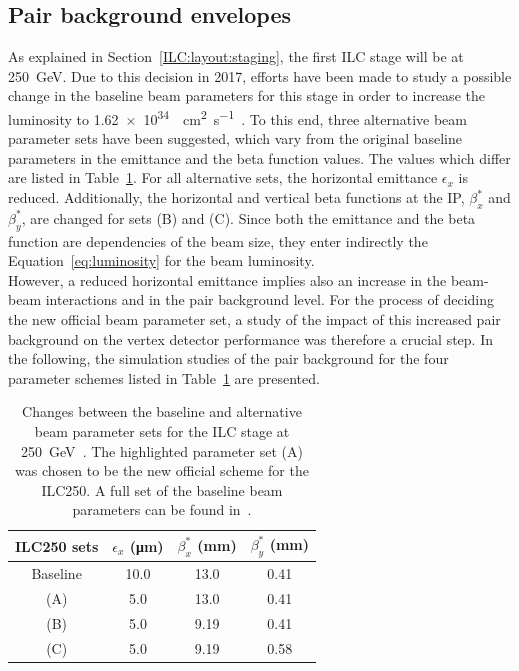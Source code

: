 \subsection{Pair background envelopes}
\label{PairBkg:envelopes}
As explained in Section~\ref{ILC:layout:staging}, the first ILC stage will be at \SI{250}{\GeV}.
Due to this decision in 2017, efforts have been made to study a possible change in the baseline beam parameters for this stage in order to increase the luminosity to \SI{1.62e34}{\per\centi\meter\squared\per\second}~\cite{LCWS17_paper}.
To this end, three alternative beam parameter sets have been suggested, which vary from the original baseline parameters in the emittance and the beta function values.
The values which differ are listed in Table~\ref{tab:ILC250_sets}.
For all alternative sets, the horizontal emittance $\epsilon_x$ is reduced. 
Additionally, the horizontal and vertical beta functions at the IP, $\beta^*_x$ and $\beta^*_y$, are changed for sets (B) and (C).
Since both the emittance and the beta function are dependencies of the beam size, they enter indirectly the Equation~\ref{eq:luminosity} for the beam luminosity.
\\However, a reduced horizontal emittance implies also an increase in the beam-beam interactions and in the pair background level.
For the process of deciding the new official beam parameter set, a study of the impact of this increased pair background on the \sid vertex detector performance was therefore a crucial step.
In the following, the simulation studies of the pair background for the four parameter schemes listed in Table~\ref{tab:ILC250_sets} are presented.
\begin{table}
\caption[New ILC250 beam parameters]{Changes between the baseline and alternative beam parameter sets for the ILC stage at \SI[detect-all]{250}{\GeV}~\cite{LCWS17_paper}.
The highlighted parameter set (A) was chosen to be the new official scheme for the ILC250.
A full set of the baseline beam parameters can be found in~\cite[p. 11]{TDR1}.}
\label{tab:ILC250_sets}
\centering
\begin{tabularx}{0.48\textwidth}{c|ccc}
\hline\hline
\textbf{ILC250 sets} & $\epsilon_x$ (\si{\micro\meter}) & $\beta^*_x$ (\si{\milli\meter}) & $\beta^*_y$ (\si{\milli\meter})\\
\hline
 Baseline & 10.0 & 13.0 & 0.41\\
\rowcolor{Gray} (A) & 5.0 & 13.0 & 0.41\\
 (B) & 5.0 & 9.19 & 0.41\\
 (C) & 5.0 & 9.19 & 0.58\\
\hline\hline
\end{tabularx}
\end{table}

